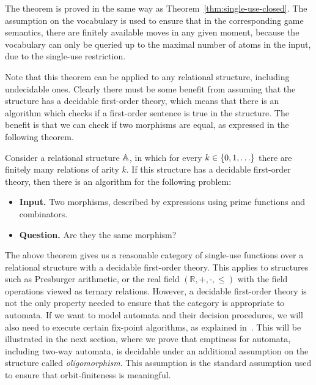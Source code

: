 The theorem is proved in the same way as Theorem~\ref{thm:single-use-closed}.  The assumption on the vocabulary is used to ensure that in the corresponding game semantics, there are finitely available moves in any given moment, because the vocabulary can only be queried up to the maximal number of atoms in the input, due to the single-use restriction.

Note that this  theorem can be applied to any relational structure, including undecidable ones. Clearly there must be some benefit from assuming that the structure has a decidable first-order theory, which means that there is an algorithm which checks if a first-order sentence is true in the structure. 
The benefit is that we can check if two morphisms are equal, as expressed in the following theorem. 

\begin{theorem}
    Consider a relational structure $\mathbb A$, in which for every $k \in \{0,1,\ldots\}$ there are finitely many relations of arity $k$. If this structure has a decidable first-order theory, then there is an algorithm for the following problem:
    \begin{itemize}
        \item {\bf Input.} Two morphisms, described by expressions using prime functions and combinators.
        \item {\bf Question.} Are they the same morphism?
    \end{itemize}
\end{theorem}




The above theorem gives us a reasonable category of single-use functions over a relational structure with a decidable first-order theory. This applies to structures such as Presburger arithmetic, or the real field $(\mathbb R, +, \cdot, \leq)$ with the field operations viewed as ternary relations. 
However, a decidable first-order theory is not the only property needed to ensure that the category is appropriate to automata. If we want to model automata and their decision procedures, we will also need to execute certain fix-point algorithms, as explained in~\cite{bojanczyk_slightly2018}. This will be illustrated in the next section, where we prove that emptiness for automata, including two-way automata, is decidable under an additional assumption on the structure called \emph{oligomorphism}. This assumption is the standard assumption used to ensure that orbit-finiteness is meaningful. 



